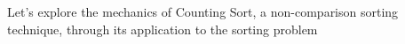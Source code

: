 \documentclass[preview]{standalone}
\begin{document}
\begin{center}
Let's explore the mechanics of Counting Sort, a non-comparison sorting technique, through its application to the sorting problem
\end{center}
\end{document}
